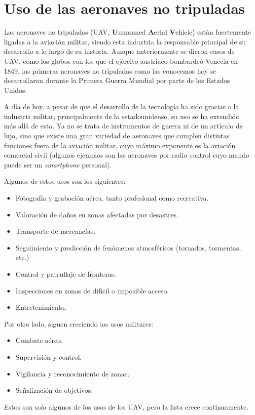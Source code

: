 \section{Uso de las aeronaves no tripuladas}
Las aeronaves no tripuladas (UAV, \textbf{U}nmanned \textbf{A}erial \textbf{V}ehicle) están fuertemente ligadas a la aviación militar, siendo esta industria la responsable principal de su desarrollo a lo largo de su historia.
Aunque anteriormente se dieron casos de UAV, como los globos con los que el ejército austriaco bombardeó Venecia en 1849, las primeras aeronaves no tripuladas como las conocemos hoy se desarrollaron durante la Primera Guerra Mundial por parte de los Estados Unidos.

A día de hoy, a pesar de que el desarrollo de la tecnología ha sido gracias a la industria militar, principalmente de la estadounidense, su uso se ha extendido más allá de esta. Ya no se trata de instrumentos de guerra ni de un artículo de lujo, sino que existe una gran variedad de aeronaves que cumplen distintas funciones fuera de la aviación militar, cuyo máximo exponente es la aviación comercial civil (algunos ejemplos son las aeronaves por radio control cuyo mando puede ser un \emph{smartphone} personal).

Algunos de estos usos son los siguientes:
\begin{itemize}
	\item Fotografía y grabación aérea, tanto profesional como recreativa.
	\item Valoración de daños en zonas afectadas por desastres.
	\item Transporte de mercancías.
	\item Seguimiento y predicción de fenómenos atmosféricos (tornados, tormentas, etc.)
	\item Control y patrullaje de fronteras.
	\item Inspecciones en zonas de difícil o imposible acceso.
	\item Entretenimiento.
\end{itemize}

Por otro lado, siguen creciendo los usos militares:
\begin{itemize}
	\item Combate aéreo.
	\item Supervisión y control.
	\item Vigilancia y reconocimiento de zonas.
	\item Señalización de objetivos.
\end{itemize}
Estos son solo algunos de los usos de los UAV, pero la lista crece continuamente.

